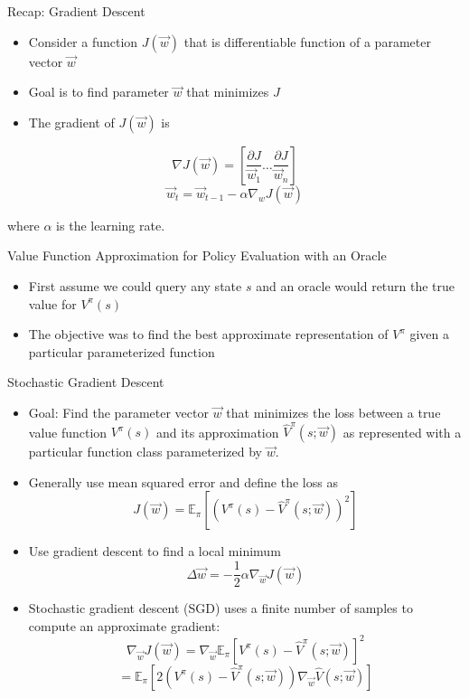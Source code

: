 \documentclass[aspectratio=169]{../latex_main/tntbeamer}  %
\begin{document}
\begin{frame}[c]{Recap: Gradient Descent}
	
	
	\begin{itemize}
		\item Consider a function $J(\vec{w})$ that is differentiable function of a parameter vector $\vec{w}$
		\item Goal is to find parameter $\vec{w}$ that minimizes $J$
		\item The gradient of $J(\vec{w})$ is 
	\end{itemize}
	$$
	\nabla J(\vec{w}) = \left[ \frac{\partial J}{\vec{w}_1} \ldots \frac{\partial J}{\vec{w}_n} \right]
	$$
	$$\vec{w}_t = \vec{w}_{t-1} - \alpha \nabla_w J(\vec{w})$$
	
	where $\alpha$ is the learning rate.

	
\end{frame}
\begin{frame}[c]{Value Function Approximation for Policy Evaluation with
		an Oracle}
	
	
	\begin{itemize}
		\item First assume we could query any state $s$ and an \alert{oracle} would return
		the true value for $V^\pi (s)$
		\item The objective was to find the best approximate representation of $V^\pi$
		given a particular parameterized function
	\end{itemize}
	
\end{frame}
\begin{frame}[c]{Stochastic Gradient Descent}
	
	
	\begin{itemize}
		\item Goal: Find the parameter vector $\vec{w}$ that minimizes the loss between a
		true value function $V^\pi(s)$ and its approximation $\hat{V}^\pi(s; \vec{w})$ as
		represented with a particular function class parameterized by $\vec{w}$.
		\item Generally use mean squared error and define the loss as 
		$$ J(\vec{w}) = \mathbb{E}_\pi [(V^\pi(s) - \hat{V}^\pi(s;\vec{w}))^2]$$
		\item Use gradient descent to find a local minimum 
		$$ \Delta \vec{w} = - \frac{1}{2} \alpha \nabla_\vec{w} J(\vec{w})$$
		\item Stochastic gradient descent (SGD) uses a finite number of samples to compute an approximate gradient:
		$$ \nabla_\vec{w} J(\vec{w}) = \nabla_{\vec{w}} \mathbb{E}_\pi[V^\pi (s) - \hat{V}^\pi (s; \vec{w})]^2$$
		$$= \mathbb{E}_\pi [2 (V^\pi(s) - \hat{V}^\pi (s;\vec{w})) \nabla_\vec{w} \hat{V}(s;\vec{w})]$$
	\end{itemize}
	
\end{frame}
\end{document}
